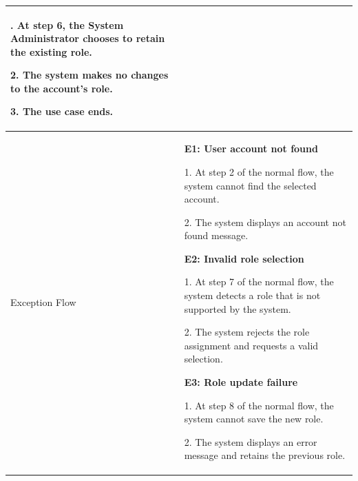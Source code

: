 \begin{longtable}{|>{\bfseries\raggedright\arraybackslash}p{}|>{\raggedright\arraybackslash}p{}|}
1. At step 6, the System Administrator chooses to retain the existing role. \par
2. The system makes no changes to the account's role. \par
3. The use case ends. \\ \hline
Exception Flow &
\textbf{E1: User account not found} \par
1. At step 2 of the normal flow, the system cannot find the selected account. \par
2. The system displays an account not found message. \par\vspace{4pt}
\textbf{E2: Invalid role selection} \par
1. At step 7 of the normal flow, the system detects a role that is not supported by the system. \par
2. The system rejects the role assignment and requests a valid selection. \par\vspace{4pt}
\textbf{E3: Role update failure} \par
1. At step 8 of the normal flow, the system cannot save the new role. \par
2. The system displays an error message and retains the previous role. \\ \hline
\end{longtable}


